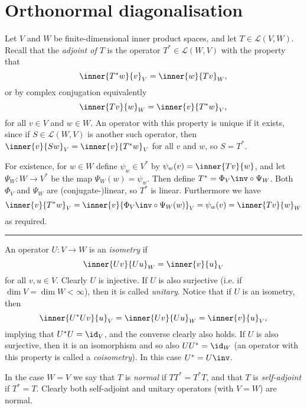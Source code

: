 \documentclass[article, a4paper, 11pt, oneside]{memoir}
\numberwithin{equation}{chapter}
\newcommand{\calL}{\mathcal{L}}
\newcommand\fleuronbreak{\fancybreak{\textcolor{linkcolor}{\adfhangingflatleafleft}}}
\begin{document}
\section{Orthonormal diagonalisation}

Let $V$ and $W$ be finite-dimensional inner product spaces, and let $T \in \calL(V,W)$. Recall that the \emph{adjoint of $T$} is the operator $T^* \in \calL(W,V)$ with the property that
%
\begin{equation*}
    \inner{T^*w}{v}_V = \inner{w}{Tv}_W,
\end{equation*}
%
or by complex conjugation equivalently
%
\begin{equation*}
    \inner{Tv}{w}_W = \inner{v}{T^*w}_V,
\end{equation*}
%
for all $v \in V$ and $w \in W$. An operator with this property is unique if it exists, since if $S \in \calL(W,V)$ is another such operator, then $\inner{v}{Sw}_V = \inner{v}{T^*w}_V$ for all $v$ and $w$, so $S = T^*$.

For existence, for $w \in W$ define $\psi_w \in V^*$ by $\psi_w(v) = \inner{Tv}{w}$, and let $\Psi_W \colon W \to V^*$ be the map $\Psi_W(w) = \psi_w$. Then define $T^* = \Phi_V\inv \circ \Psi_W$. Both $\Phi_V$ and $\Psi_W$ are (conjugate-)linear, so $T^*$ is linear. Furthermore we have
%
\begin{equation*}
    \inner{v}{T^*w}_V
        = \inner{v}{\Phi_V\inv \circ \Psi_W(w)}_V
        = \psi_w(v)
        = \inner{Tv}{w}_W
\end{equation*}
%
as required.

\fleuronbreak

An operator $U \colon V \to W$ is an \emph{isometry} if
%
\begin{equation*}
    \inner{Uv}{Uu}_W
        = \inner{v}{u}_V
\end{equation*}
%
for all $v,u \in V$. Clearly $U$ is injective. If $U$ is also surjective (i.e. if $\dim V = \dim W < \infty$), then it is called \emph{unitary}. Notice that if $U$ is an isometry, then
%
\begin{equation*}
    \inner{U^*Uv}{u}_V
        = \inner{Uv}{Uu}_W
        = \inner{v}{u}_V,
\end{equation*}
%
implying that $U^*U = \id_V$, and the converse clearly also holds. If $U$ is also surjective, then it is an isomorphism and so also $UU^* = \id_W$ (an operator with this property is called a \emph{coisometry}). In this case $U^* = U\inv$.

In the case $W = V$ we say that $T$ is \emph{normal} if $TT^* = T^*T$, and that $T$ is \emph{self-adjoint} if $T^* = T$. Clearly both self-adjoint and unitary operators (with $V = W$) are normal.
\end{document}
